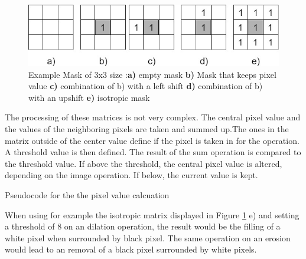\begin{figure}[H]
\includegraphics[width=\textwidth]{images/morpological_kernels.jpg}
\caption{ Example Mask of 3x3 size :\textbf{a)} empty mask \textbf{b)} Mask that keeps pixel value  \textbf{c)} combination of b) with a left shift   \textbf{d)} combination of b) with an upshift   \textbf{e)} isotropic mask}
\label{morphological_ops} 
\end{figure}
The processing of these matrices is not very complex. The central pixel value and the values of the neighboring pixels are taken and summed up.The ones in the matrix outside of the center value define if the pixel is taken in for the operation. A threshold value is then defined. The result of the sum operation is compared to the threshold value. If above the threshold, the central pixel value is altered, depending on the image operation. If below, the current value is kept.
\begin{algorithm}
\SetAlgoLined
{}
\BlankLine
{}
\BlankLine
{}
\If{\Result $>=$ \Threshold}{\CentVal$=$ \OpVal}
\caption{Pseudocode for the the pixel value calcuation}
\label{mask_calc_pseudocode}
\end{algorithm}

When using for example the isotropic matrix displayed in Figure \ref{morphological_ops} e) and setting a threshold of 8 on an dilation operation, the result would be the filling of a white pixel when surrounded by black pixel. The same operation on an erosion would lead to an removal of a black pixel surrounded by white pixels.

